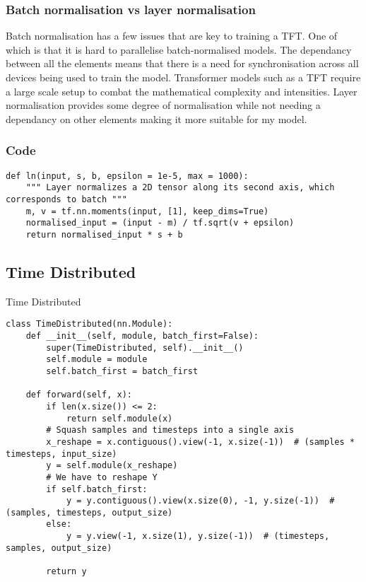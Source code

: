 \documentclass{article}
\begin{document}
\subsubsection{Batch normalisation vs layer normalisation}
Batch normalisation has a few issues that are key to training a TFT. One of which is that
it is hard to parallelise batch-normalised models. The dependancy between all the elements
 means that there is a need for synchronisation across all devices being used to train the model. Transformer models such as a TFT require a large scale setup to combat the
 mathematical complexity and intensities. Layer normalisation provides some degree of
 normalisation while not needing a dependancy on other elements making it more suitable
 for my model.
\subsubsection{Code}
\begin{lstlisting}
def ln(input, s, b, epsilon = 1e-5, max = 1000):
    """ Layer normalizes a 2D tensor along its second axis, which corresponds to batch """
    m, v = tf.nn.moments(input, [1], keep_dims=True)
    normalised_input = (input - m) / tf.sqrt(v + epsilon)
    return normalised_input * s + b
\end{lstlisting}
\clearpage





\subsection{Time Distributed}
Time Distributed

\begin{lstlisting}
class TimeDistributed(nn.Module):
    def __init__(self, module, batch_first=False):
        super(TimeDistributed, self).__init__()
        self.module = module
        self.batch_first = batch_first

    def forward(self, x):
        if len(x.size()) <= 2:
            return self.module(x)
        # Squash samples and timesteps into a single axis
        x_reshape = x.contiguous().view(-1, x.size(-1))  # (samples * timesteps, input_size)
        y = self.module(x_reshape)
        # We have to reshape Y
        if self.batch_first:
            y = y.contiguous().view(x.size(0), -1, y.size(-1))  # (samples, timesteps, output_size)
        else:
            y = y.view(-1, x.size(1), y.size(-1))  # (timesteps, samples, output_size)

        return y
\end{lstlisting}
\end{document}
